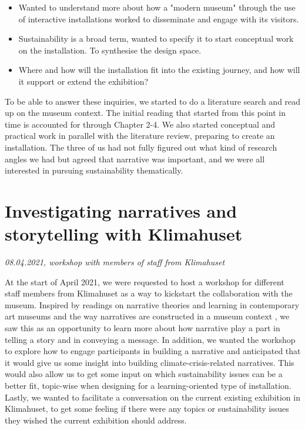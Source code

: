 \begin{itemize}
    \item Wanted to understand more about how a "modern museum" through the use of interactive installations worked to disseminate and engage with its visitors.
    \item Sustainability is a broad term, wanted to specify it to start conceptual work on the installation. To synthesise the design space.
    \item Where and how will the installation fit into the existing journey, and how will it support or extend the exhibition?
\end{itemize}

To be able to answer these inquiries, we started to do a literature search and read up on the museum context. The initial reading that started from this point in time is accounted for through Chapter 2-4. We also started conceptual and practical work in parallel with the literature review, preparing to create an installation. The three of us had not fully figured out what kind of research angles we had but agreed that narrative was important, and we were all interested in pursuing sustainability thematically.

\break
\section{Investigating narratives and storytelling with Klimahuset}
\par
\emph{08.04.2021, workshop with members of staff from Klimahuset}
\par

At the start of April 2021, we were requested to host a workshop for different staff members from Klimahuset as a way to kickstart the collaboration with the museum. Inspired by readings on narrative theories and learning in contemporary art museums and the way narratives are constructed in a museum context \autocite{narrative_sitzia}, we saw this as an opportunity to learn more about how narrative play a part in telling a story and in conveying a message. In addition, we wanted the workshop to explore how to engage participants in building a narrative and anticipated that it would give us some insight into building climate-crisis-related narratives. This would also allow us to get some input on which sustainability issues can be a better fit, topic-wise when designing for a learning-oriented type of installation. Lastly, we wanted to facilitate a conversation on the current existing exhibition in Klimahuset, to get some feeling if there were any topics or sustainability issues they wished the current exhibition should address. 

